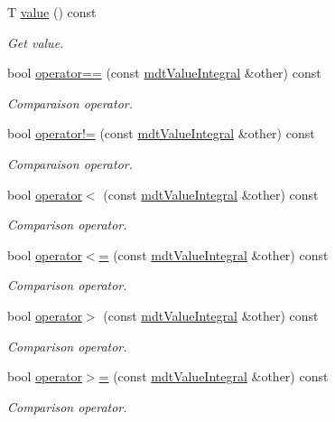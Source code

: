 \begin{DoxyCompactItemize}
T \hyperlink{classmdt_value_integral_aae3159993261e0ba5d1a4a3e53bb207d}{value} () const 
\begin{DoxyCompactList}\small\item\em Get value. \end{DoxyCompactList}\item 
bool \hyperlink{classmdt_value_integral_abe423020a094172b07521b53ea3d4183}{operator==} (const \hyperlink{classmdt_value_integral}{mdt\-Value\-Integral} \&other) const 
\begin{DoxyCompactList}\small\item\em Comparaison operator. \end{DoxyCompactList}\item 
bool \hyperlink{classmdt_value_integral_a93a8f7e8351c03893c13671bd6ebbeea}{operator!=} (const \hyperlink{classmdt_value_integral}{mdt\-Value\-Integral} \&other) const 
\begin{DoxyCompactList}\small\item\em Comparaison operator. \end{DoxyCompactList}\item 
bool \hyperlink{classmdt_value_integral_ac733c0302c824436d6231406f7d1649f}{operator$<$} (const \hyperlink{classmdt_value_integral}{mdt\-Value\-Integral} \&other) const 
\begin{DoxyCompactList}\small\item\em Comparison operator. \end{DoxyCompactList}\item 
bool \hyperlink{classmdt_value_integral_a7ede8534cb1885521d5a2f00cc07e140}{operator$<$=} (const \hyperlink{classmdt_value_integral}{mdt\-Value\-Integral} \&other) const 
\begin{DoxyCompactList}\small\item\em Comparison operator. \end{DoxyCompactList}\item 
bool \hyperlink{classmdt_value_integral_a69a01c539e04613f4cc0a2d8e7858d51}{operator$>$} (const \hyperlink{classmdt_value_integral}{mdt\-Value\-Integral} \&other) const 
\begin{DoxyCompactList}\small\item\em Comparison operator. \end{DoxyCompactList}\item 
bool \hyperlink{classmdt_value_integral_a8bae412ed7d1144a66c90bd231de24fe}{operator$>$=} (const \hyperlink{classmdt_value_integral}{mdt\-Value\-Integral} \&other) const 
\begin{DoxyCompactList}\small\item\em Comparison operator. \end{DoxyCompactList}\item 

\end{DoxyCompactItemize}

